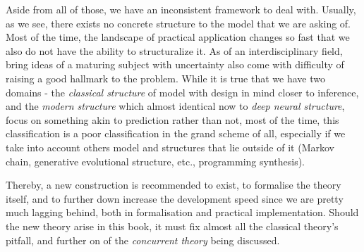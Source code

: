 Aside from all of those, we have an inconsistent framework to deal with. Usually, as we see, there exists no concrete structure to the model that we are asking of. Most of the time, the landscape of practical application changes so fast that we also do not have the ability to structuralize it. As of an interdisciplinary field, bring ideas of a maturing subject with uncertainty also come with difficulty of raising a good hallmark to the problem. While it is true that we have two domains - the \textit{classical structure} of model with design in mind closer to inference, and the \textit{modern structure} which almost identical now to \textit{deep neural structure}, focus on something akin to prediction rather than not, most of the time, this classification is a poor classification in the grand scheme of all, especially if we take into account others model and structures that lie outside of it (Markov chain, generative evolutional structure, etc., programming synthesis). 

Thereby, a new construction is recommended to exist, to formalise the theory itself, and to further down increase the development speed since we are pretty much lagging behind, both in formalisation and practical implementation. Should the new theory arise in this book, it must fix almost all the classical theory's pitfall, and further on of the \textit{concurrent theory} being discussed. 